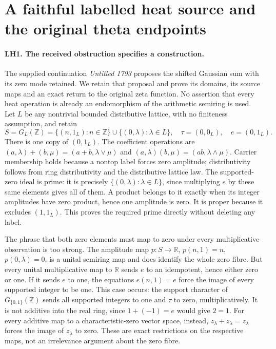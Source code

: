 \section{A faithful labelled heat source and the original theta endpoints}
\label{sec:labelled-heat-original-theta}

\paragraph{LH1. The received obstruction specifies a construction.}
The supplied continuation \emph{Untitled 1793} proposes the shifted
Gaussian sum with its zero mode retained. We retain that proposal and
prove its domains, its source maps and an exact return to the original
zeta function. No assertion that every heat operation is already an
endomorphism of the arithmetic semiring is used.
Let \(L\) be any nontrivial bounded distributive lattice, with no
finiteness assumption, and retain
\[
 S=G_L(\mathbb Z)
 =\{(n,1_L):n\in\mathbb Z\}\cup\{(0,\lambda):\lambda\in L\},
 \quad \tau=(0,0_L),\quad e=(0,1_L).             \tag{LH1}
\]
There is one copy of \((0,1_L)\). The coefficient operations are
\((a,\lambda)+(b,\mu)=(a+b,\lambda\vee\mu)\) and
\((a,\lambda)(b,\mu)=(ab,\lambda\wedge\mu)\). Carrier membership
holds because a nontop label forces zero amplitude; distributivity
follows from ring distributivity and the distributive lattice law.
The supported-zero ideal is prime: it is precisely
\(\{(0,\lambda):\lambda\in L\}\), since multiplying \(e\)
by these same elements gives all of them. A product belongs to
it exactly when its integer amplitudes have zero product, hence
one amplitude is zero. It is proper because it excludes \((1,1_L)\).
This proves the required prime directly without deleting any label.

The phrase that both zero elements must map to zero under every
multiplicative observation is too strong. The amplitude map
\(p:S\to\mathbb R\), \(p(n,1)=n\), \(p(0,\lambda)=0\),
is a unital semiring map and does identify the whole zero fibre.
But every unital multiplicative map to \(\mathbb R\) sends
\(e\) to an idempotent, hence either zero or one. If it sends
\(e\) to one, the equations \(e(n,1)=e\) force the image of
every supported integer to be one. This case occurs: the support
character of \(G_{\{0,1\}}(\mathbb Z)\) sends all supported
integers to one and \(\tau\) to zero, multiplicatively. It is
not additive into the real ring, since \(1+(-1)=e\) would give
\(2=1\). For every additive map to a characteristic-zero vector
space, instead, \(z_\lambda+z_\lambda=z_\lambda\) forces the
image of \(z_\lambda\) to zero. These are exact restrictions on
the respective maps, not an irrelevance argument about the zero fibre.

